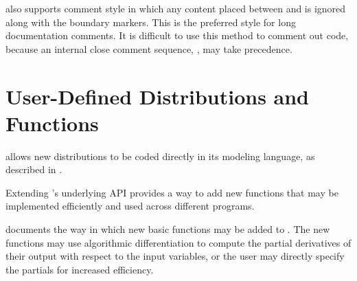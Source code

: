 \Stan also supports \Cpp comment style in which any content placed
between \code{/*} and \code{*/} is ignored along with the boundary
markers.  This is the preferred style for long documentation comments.
It is difficult to use this method to comment out code, because 
an internal close comment sequence, \code{*/}, may take precedence.


\section{User-Defined Distributions and Functions}

\Stan allows new distributions to be coded directly in its modeling
language, as described in . 

Extending \Stan's underlying \Cpp API provides a way to add new
functions that may be implemented efficiently and used across
different \Stan programs.

 documents the way in which new
basic functions may be added to \Stan.  The new functions may use
algorithmic differentiation to compute the partial derivatives of
their output with respect to the input variables, or the user may
directly specify the partials for increased efficiency.

